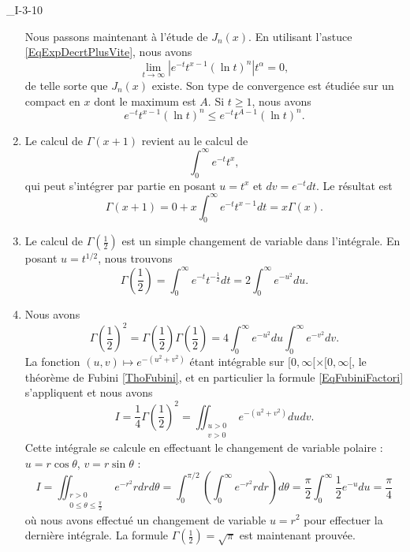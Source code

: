 \begin{corrige}{_I-3-10}
\begin{enumerate}
Nous passons maintenant à l'étude de $J_n(x)$. En utilisant l'astuce \eqref{EqExpDecrtPlusVite}, nous avons
\begin{equation}
	\lim_{t\to\infty}|  e^{-t}t^{x-1}(\ln t)^n |t^{\alpha}=0,
\end{equation}
de telle sorte que $J_n(x)$ existe. Son type de convergence est étudiée sur un compact en $x$ dont le maximum est $A$. Si $t\geq 1$, nous avons
\begin{equation}
	 e^{-t}t^{x-1}(\ln t)^n\leq  e^{-t}t^{A-1}(\ln t)^n.
\end{equation}

\item
Le calcul de $\Gamma(x+1)$ revient au le calcul de
\begin{equation}
	\int_0^{\infty} e^{-t}t^x,
\end{equation}
qui peut s'intégrer par partie en posant $u=t^x$ et $dv= e^{-t}dt$. Le résultat est
\begin{equation}
	\Gamma(x+1)=0+x\int_0^{\infty} e^{-t}t^{x-1}dt=x\Gamma(x).
\end{equation}

\item
Le calcul de $\Gamma(\frac{ 1 }{2})$ est un simple changement de variable dans l'intégrale. En posant $u=t^{1/2}$, nous trouvons
\begin{equation}
\Gamma(\frac{ 1 }{2})=\int_0^{\infty} e^{-t}t^{-\frac{ 1 }{2}}dt=2\int_0^{\infty} e^{-u^2}du.
\end{equation}

\item
Nous avons
\begin{equation}
	\Gamma(\frac{ 1 }{2})^2=\Gamma(\frac{ 1 }{2})\Gamma(\frac{ 1 }{2})=4\int_0^{\infty} e^{-u^2}du\int_0^{\infty} e^{-v^2}dv.
\end{equation}
La fonction $(u,v)\mapsto e^{-(u^2+v^2)}$ étant intégrable sur $[0,\infty[\times [0,\infty[$, le théorème de Fubini \ref{ThoFubini}, et en particulier la formule \eqref{EqFubiniFactori} s'appliquent et nous avons
\begin{equation}
	I=\frac{1}{ 4 }\Gamma(\frac{ 1 }{2})^2=\iint_{\substack{u>0\\v>0}} e^{-(u^2+v^2)}dudv.
\end{equation}
Cette intégrale se calcule en effectuant le changement de variable polaire : $u=r\cos\theta$, $v=r\sin\theta$ :
\begin{equation}
	I=\iint_{\substack{r>0\\0\leq\theta\leq\frac{ \pi }{2}}} e^{-r^2}rdrd\theta=\int_0^{\pi/2}\left( \int_0^{\infty} e^{-r^2}rdr \right)d\theta
		=\frac{ \pi }{2}\int_0^{\infty}\frac{ 1 }{2} e^{-u}du=\frac{ \pi }{ 4 }
\end{equation}
où nous avons effectué un changement de variable $u=r^2$ pour effectuer la dernière intégrale. La formule $\Gamma(\frac{ 1 }{2})=\sqrt{\pi}$ est maintenant prouvée.


\end{enumerate}
\end{corrige}
